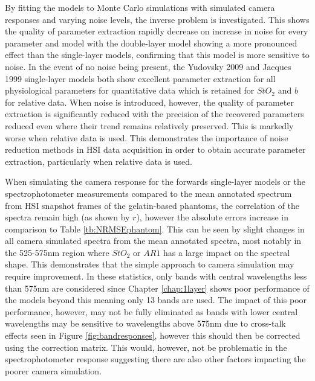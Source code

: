By fitting the models to Monte Carlo simulations with simulated camera responses and varying noise levels, the inverse problem is investigated. This shows the quality of parameter extraction rapidly decrease on increase in noise for every parameter and model with the double-layer model showing a more pronounced effect than the single-layer models, confirming that this model is more sensitive to noise. In the event of no noise being present, the Yudovsky 2009 and Jacques 1999 single-layer models both show excellent parameter extraction for all physiological parameters for quantitative data which is retained for $StO_2$ and $b$ for relative data. When noise is introduced, however, the quality of parameter extraction is significantly reduced with the precision of the recovered parameters reduced even where their trend remains relatively preserved. This is markedly worse when relative data is used. This demonstrates the importance of noise reduction methods in HSI data acquisition in order to obtain accurate parameter extraction, particularly when relative data is used. 

When simulating the camera response for the forwards single-layer models or the spectrophotometer measurements compared to the mean annotated spectrum from HSI snapshot frames of the gelatin-based phantoms, the correlation of the spectra remain high (as shown by $r$), however the absolute errors increase in comparison to Table \ref{tb:NRMSEphantom}. This can be seen by slight changes in all camera simulated spectra from the mean annotated spectra, most notably in the 525-575nm region where $StO_2$ or $AR1$ has a large impact on the spectral shape. This demonstrates that the simple approach to camera simulation may require improvement. In these statistics, only bands with central wavelengths less than 575nm are considered since Chapter \ref{chap:1layer} shows poor performance of the models beyond this meaning only 13 bands are used. The impact of this poor performance, however, may not be fully eliminated as bands with lower central wavelengths may be sensitive to wavelengths above 575nm due to cross-talk effects seen in Figure \ref{fig:bandresponses}, however this should then be corrected using the correction matrix. This would, however, not be problematic in the spectrophotometer response suggesting there are also other factors impacting the poorer camera simulation. 

